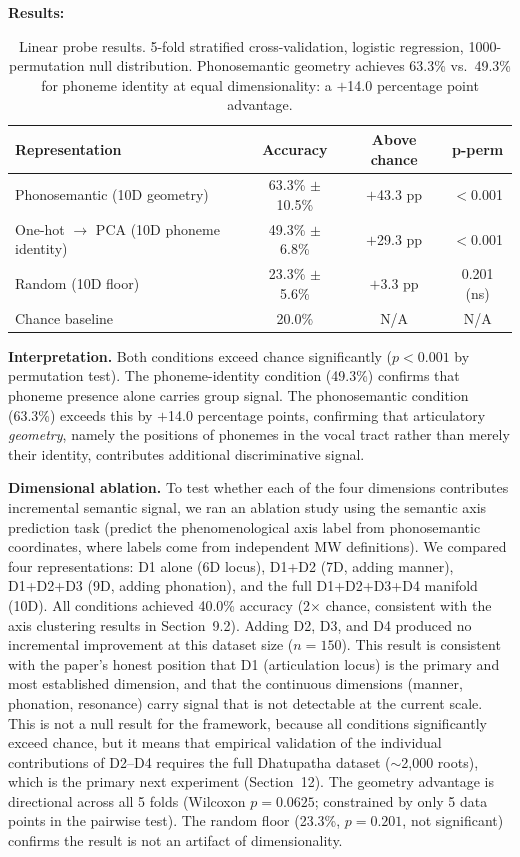 \documentclass[12pt]{article}
\begin{document}
\textbf{Results:}

\begin{table}[htbp]
\centering
\renewcommand{\arraystretch}{1.3}
\begin{tabular}{lccc}
\toprule
\textbf{Representation} & \textbf{Accuracy} & \textbf{Above chance} & \textbf{p-perm} \\
\midrule
Phonosemantic (10D geometry) & 63.3\% $\pm$ 10.5\% & $+$43.3 pp & $<$0.001 \\
One-hot $\to$ PCA (10D phoneme identity) & 49.3\% $\pm$ 6.8\% & $+$29.3 pp & $<$0.001 \\
Random (10D floor) & 23.3\% $\pm$ 5.6\% & $+$3.3 pp & 0.201 (ns) \\
Chance baseline & 20.0\% & N/A & N/A \\
\bottomrule
\end{tabular}
\caption{Linear probe results. 5-fold stratified cross-validation, logistic regression, 1000-permutation null distribution. Phonosemantic geometry achieves 63.3\% vs.\ 49.3\% for phoneme identity at equal dimensionality: a $+$14.0 percentage point advantage.}
\end{table}

\textbf{Interpretation.} Both conditions exceed chance significantly ($p < 0.001$ by permutation test). The phoneme-identity condition (49.3\%) confirms that phoneme presence alone carries group signal. The phonosemantic condition (63.3\%) exceeds this by $+$14.0 percentage points, confirming that articulatory \textit{geometry}, namely the positions of phonemes in the vocal tract rather than merely their identity, contributes additional discriminative signal.

\textbf{Dimensional ablation.} To test whether each of the four dimensions contributes incremental semantic signal, we ran an ablation study using the semantic axis prediction task (predict the phenomenological axis label from phonosemantic coordinates, where labels come from independent MW definitions). We compared four representations: D1 alone (6D locus), D1+D2 (7D, adding manner), D1+D2+D3 (9D, adding phonation), and the full D1+D2+D3+D4 manifold (10D). All conditions achieved 40.0\% accuracy (2$\times$ chance, consistent with the axis clustering results in Section~9.2). Adding D2, D3, and D4 produced no incremental improvement at this dataset size ($n=150$). This result is consistent with the paper's honest position that D1 (articulation locus) is the primary and most established dimension, and that the continuous dimensions (manner, phonation, resonance) carry signal that is not detectable at the current scale. This is not a null result for the framework, because all conditions significantly exceed chance, but it means that empirical validation of the individual contributions of D2--D4 requires the full Dhatupatha dataset ($\sim$2,000 roots), which is the primary next experiment (Section~12). The geometry advantage is directional across all 5 folds (Wilcoxon $p = 0.0625$; constrained by only 5 data points in the pairwise test). The random floor (23.3\%, $p = 0.201$, not significant) confirms the result is not an artifact of dimensionality.
\end{document}
